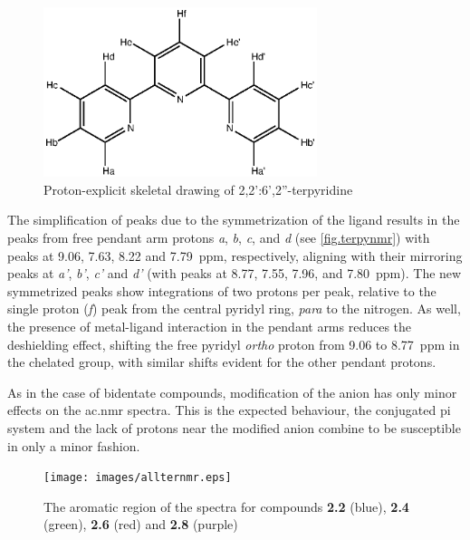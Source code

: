 \begin{figure}[!htb]
 \begin{center}
  \includegraphics[clip=true, width=80mm, keepaspectratio]{images/expandedterpyridine.eps}
 \end{center}
\caption[Proton-explicit skeletal drawing of 2,2':6',2''-terpyridine]{Proton-explicit skeletal drawing of 2,2':6',2''-terpyridine}
\label{fig.terpynmr}
\end{figure} 

The simplification of peaks due to the symmetrization of the ligand results in the peaks from free pendant arm protons \textit{a}, \textit{b}, \textit{c}, and \textit{d} (see \autoref{fig.terpynmr}) with peaks at 9.06, 7.63, 8.22 and 7.79~ppm, respectively, aligning with their mirroring peaks at \textit{a'}, \textit{b'}, \textit{c'} and \textit{d'} (with peaks at 8.77, 7.55, 7.96, and 7.80~ppm). The new symmetrized peaks show integrations of two protons per peak, relative to the single proton (\textit{f}) peak from the central pyridyl ring, \textit{para} to the nitrogen. As well, the presence of metal-ligand interaction in the pendant arms reduces the deshielding effect, shifting the free pyridyl \textit{ortho} proton from 9.06 to 8.77~ppm in the chelated group, with similar shifts evident for the other pendant protons.

As in the case of bidentate compounds, modification of the anion has only minor effects on the \gls{ac.nmr} spectra. This is the expected behaviour, the conjugated pi system and the lack of protons near the modified anion combine to be susceptible in only a minor fashion.  

\begin{figure}[!htb]
 \begin{center}
  \texttt{[image: images/allternmr.eps]}
 \end{center}
\caption[The aromatic region of the \texorpdfstring{}{1H}  spectra of the four terdentate compounds]{The aromatic region of the \texorpdfstring{}{1H}  spectra for compounds \textbf{2.2} (blue), \textbf{2.4} (green), \textbf{2.6} (red) and \textbf{2.8} (purple)}
\label{fig.ter4nmr}
\end{figure} 


